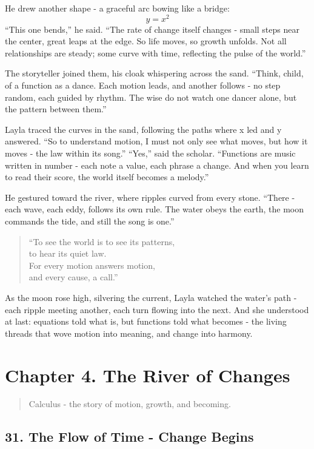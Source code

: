\documentclass[
  letterpaper,
  DIV=11,
  numbers=noendperiod]{scrreprt}
\begin{document}
He drew another shape - a graceful arc bowing like a bridge: \[
y = x^2
\] ``This one bends,'' he said. ``The rate of change itself changes -
small steps near the center, great leaps at the edge. So life moves, so
growth unfolds. Not all relationships are steady; some curve with time,
reflecting the pulse of the world.''

The storyteller joined them, his cloak whispering across the sand.
``Think, child, of a function as a dance. Each motion leads, and another
follows - no step random, each guided by rhythm. The wise do not watch
one dancer alone, but the pattern between them.''

Layla traced the curves in the sand, following the paths where x led and
y answered. ``So to understand motion, I must not only see what moves,
but how it moves - the law within its song.'' ``Yes,'' said the scholar.
``Functions are music written in number - each note a value, each phrase
a change. And when you learn to read their score, the world itself
becomes a melody.''

He gestured toward the river, where ripples curved from every stone.
``There - each wave, each eddy, follows its own rule. The water obeys
the earth, the moon commands the tide, and still the song is one.''

\begin{quote}
``To see the world is to see its patterns,\\
to hear its quiet law.\\
For every motion answers motion,\\
and every cause, a call.''
\end{quote}

As the moon rose high, silvering the current, Layla watched the water's
path - each ripple meeting another, each turn flowing into the next. And
she understood at last: equations told what is, but functions told what
becomes - the living threads that wove motion into meaning, and change
into harmony.

\section{Chapter 4. The River of
Changes}\label{chapter-4.-the-river-of-changes}

\begin{quote}
Calculus - the story of motion, growth, and becoming.
\end{quote}

\subsection{31. The Flow of Time - Change
Begins}\label{the-flow-of-time---change-begins}
\end{document}
